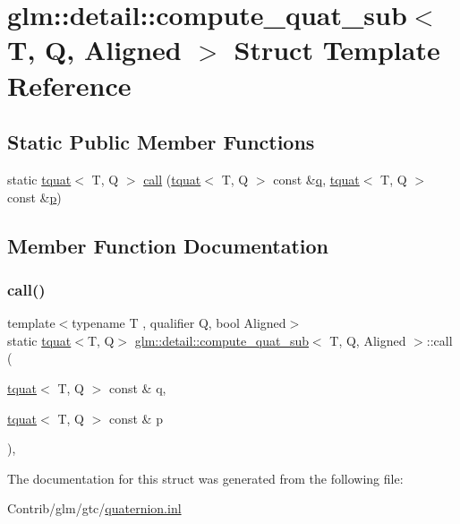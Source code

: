 \hypertarget{structglm_1_1detail_1_1compute__quat__sub}{}\section{glm\+:\+:detail\+:\+:compute\+\_\+quat\+\_\+sub$<$ T, Q, Aligned $>$ Struct Template Reference}
\label{structglm_1_1detail_1_1compute__quat__sub}
\subsection*{Static Public Member Functions}
\begin{DoxyCompactItemize}
\item 
static \mbox{\hyperlink{structglm_1_1tquat}{tquat}}$<$ T, Q $>$ \mbox{\hyperlink{structglm_1_1detail_1_1compute__quat__sub_ac0bcb0d1dd7a6392e90d50328f304cdf}{call}} (\mbox{\hyperlink{structglm_1_1tquat}{tquat}}$<$ T, Q $>$ const \&\mbox{\hyperlink{_s_d_l__opengl_8h_a8fc1e7b9baaae687804c7eed46ca09c6}{q}}, \mbox{\hyperlink{structglm_1_1tquat}{tquat}}$<$ T, Q $>$ const \&\mbox{\hyperlink{_s_d_l__opengl__glext_8h_aa5367c14d90f462230c2611b81b41d23}{p}})
\end{DoxyCompactItemize}


\subsection{Member Function Documentation}
\mbox{\label{structglm_1_1detail_1_1compute__quat__sub_ac0bcb0d1dd7a6392e90d50328f304cdf}} 
\subsubsection{\texorpdfstring{call()}{call()}}
{\footnotesize\ttfamily template$<$typename T , qualifier Q, bool Aligned$>$ \\
static \mbox{\hyperlink{structglm_1_1tquat}{tquat}}$<$T, Q$>$ \mbox{\hyperlink{structglm_1_1detail_1_1compute__quat__sub}{glm\+::detail\+::compute\+\_\+quat\+\_\+sub}}$<$ T, Q, Aligned $>$\+::call (\begin{DoxyParamCaption}\item[{\mbox{\hyperlink{structglm_1_1tquat}{tquat}}$<$ T, Q $>$ const \&}]{q,  }\item[{\mbox{\hyperlink{structglm_1_1tquat}{tquat}}$<$ T, Q $>$ const \&}]{p }\end{DoxyParamCaption})\hspace{0.3cm}{\ttfamily [inline]}, {\ttfamily [static]}}



The documentation for this struct was generated from the following file\+:\begin{DoxyCompactItemize}
\item 
Contrib/glm/gtc/\mbox{\hyperlink{gtc_2quaternion_8inl}{quaternion.\+inl}}\end{DoxyCompactItemize}
